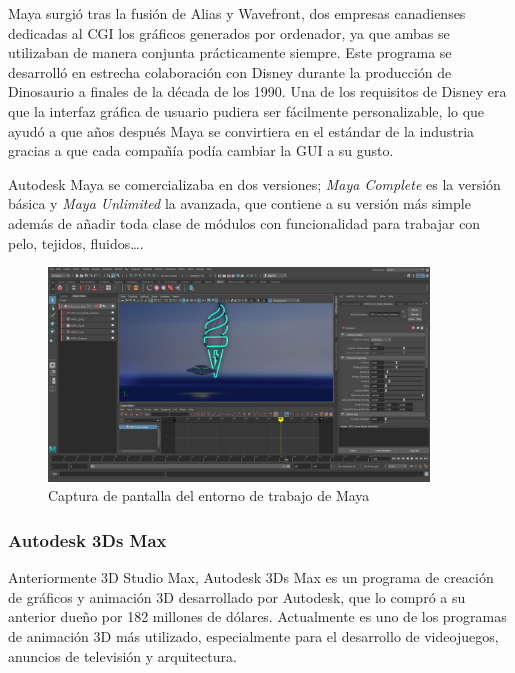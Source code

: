 Maya surgió tras la fusión de Alias y Wavefront, dos empresas canadienses dedicadas al \acs{CGI} los gráficos generados por ordenador, ya que ambas se utilizaban de manera conjunta prácticamente siempre. Este programa se desarrolló en estrecha colaboración con Disney durante la producción de Dinosaurio a finales de la década de los 1990. Una de los requisitos de Disney era que la interfaz gráfica de usuario pudiera ser fácilmente personalizable, lo que ayudó a que años después Maya se convirtiera en el estándar de la industria gracias a que cada compañía podía cambiar la \acs{GUI} a su gusto.

Autodesk Maya se comercializaba en dos versiones; \textit{Maya Complete} es la versión básica y \textit{Maya Unlimited} la avanzada, que contiene a su versión más simple además de añadir toda clase de módulos con funcionalidad para trabajar con pelo, tejidos, fluidos\dots{}.

\begin{figure}[!h]
\begin{center}
\includegraphics[width=0.9\textwidth]{imagenes/2/maya.jpg}
\caption{Captura de pantalla del entorno de trabajo de Maya}
\label{fig:maya}
\end{center}
\end{figure}

\subsubsection{Autodesk 3Ds Max}

Anteriormente 3D Studio Max, Autodesk 3Ds Max es un programa de creación de gráficos y animación 3D desarrollado por Autodesk, que lo compró a su anterior dueño por 182 millones de dólares. Actualmente es uno de los programas de animación 3D más utilizado, especialmente para el desarrollo de videojuegos, anuncios de televisión y arquitectura.

